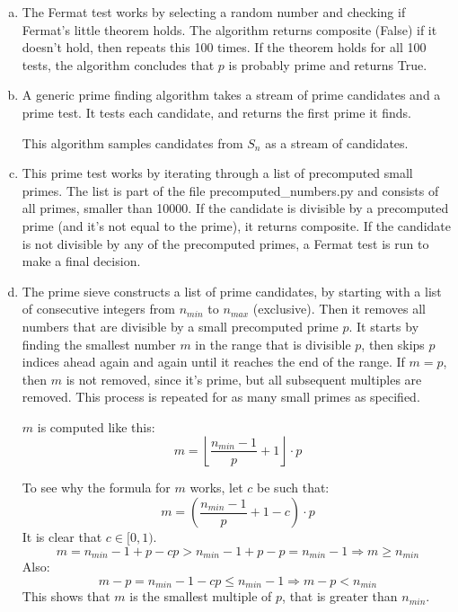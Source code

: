 \documentclass[12pt,a4paper]{article}
\begin{document}
\begin{enumerate}[a)]
    \setlength{\itemsep}{10pt}
    \item
    The Fermat test works by selecting a random number and checking if Fermat's little theorem holds.
    The algorithm returns composite (False) if it doesn't hold, then repeats this 100 times.
    If the theorem holds for all 100 tests, the algorithm concludes that \(p\) is probably prime and returns True.
    \vspace{20pt}
    
    \item
    A generic prime finding algorithm takes a stream of prime candidates and a prime test.
    It tests each candidate, and returns the first prime it finds.
    
    \vspace{20pt}
    This algorithm samples candidates from \(S_n\) as a stream of candidates.
    
    \item
    This prime test works by iterating through a list of precomputed small primes.
    The list is part of the file precomputed\_numbers.py and consists of all primes, smaller than 10000.
    If the candidate is divisible by a precomputed prime (and it's not equal to the prime), it returns composite.
    If the candidate is not divisible by any of the precomputed primes, a Fermat test is run to make a final decision.
    
    \item
    The prime sieve constructs a list of prime candidates, by starting with a list of consecutive integers from
    \(n_{min}\) to \(n_{max}\) (exclusive).
    Then it removes all numbers that are divisible by a small precomputed prime \(p\).
    It starts by finding the smallest number \(m\) in the range that is divisible \(p\), then skips \(p\) indices ahead
    again and again until it reaches the end of the range.
    If \(m = p\), then \(m\) is not removed, since it's prime, but all subsequent multiples are removed.
    This process is repeated for as many small primes as specified.

    \(m\) is computed like this:
    \[m = \left\lfloor \frac{n_{min}-1}{p} + 1 \right\rfloor \cdot p\]
    
    To see why the formula for \(m\) works, let \(c\) be such that:
    \[m = \left( \frac{n_{min}-1}{p} + 1 - c \right) \cdot p\]
    It is clear that \(c \in [0, 1)\).
    \[m = n_{min} - 1 + p - cp > n_{min} - 1 + p - p = n_{min} - 1 \Rightarrow m \geq n_{min}\]
    Also:
    \[m - p = n_{min} - 1 - cp \leq n_{min} - 1 \Rightarrow m - p < n_{min}\]
    This shows that \(m\) is the smallest multiple of \(p\), that is greater than \(n_{min}\).


\end{enumerate}
\end{document}
